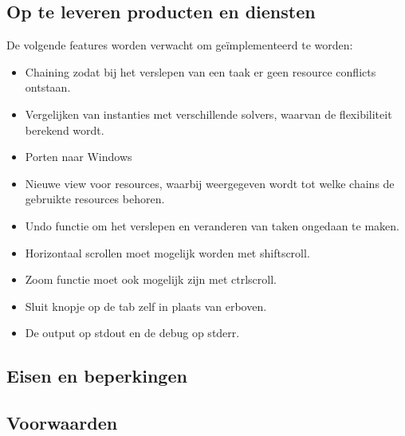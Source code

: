 \subsection{Op te leveren producten en diensten}
De volgende features worden verwacht om ge\"implementeerd te worden:
\begin{itemize}
	\item Chaining zodat bij het verslepen van een taak er geen resource conflicts ontstaan.
	\item Vergelijken van instanties met verschillende solvers, waarvan de flexibiliteit berekend wordt.
	\item Porten naar Windows
	\item Nieuwe view voor resources, waarbij weergegeven wordt tot welke chains de gebruikte resources behoren.
	\item Undo functie om het verslepen en veranderen van taken ongedaan te maken.
	\item Horizontaal scrollen moet mogelijk worden met shift\plus scroll.
	\item Zoom functie moet ook mogelijk zijn met ctrl\plus scroll.
	\item Sluit knopje op de tab zelf in plaats van erboven.
	\item De output op stdout en de debug op stderr.
\end{itemize}

\subsection{Eisen en beperkingen}
\subsection{Voorwaarden}

